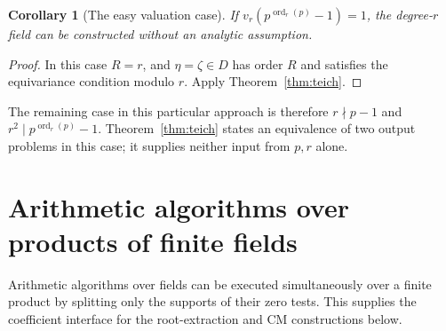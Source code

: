 \documentclass[11pt]{article}
\newcommand{\ord}{\operatorname{ord}}
\newtheorem{corollary}[theorem]{Corollary}
\theoremstyle{definition}
\theoremstyle{remark}
\begin{document}
\begin{corollary}[The easy valuation case]\label{cor:valuationone}
If $v_r(p^{\ord_r(p)}-1)=1$, the degree-$r$ field can be
constructed without an analytic assumption.
\end{corollary}
\begin{proof}
In this case $R=r$, and $\eta=\zeta\in D$ has order $R$
and satisfies the equivariance condition modulo $r$.
Apply Theorem~\ref{thm:teich}.
\end{proof}

The remaining case in this particular approach is therefore
$r\nmid p-1$ and $r^2\mid p^{\ord_r(p)}-1$.
Theorem~\ref{thm:teich} states an equivalence of two output
problems in this case; it supplies neither input from $p,r$ alone.

\section{Arithmetic algorithms over products of finite fields}
\label{sec:cm-etale-interface}

Arithmetic algorithms over fields can be executed simultaneously
over a finite product by splitting only the supports of their zero
tests. This supplies the coefficient interface for the root-extraction
and CM constructions below.
\end{document}
